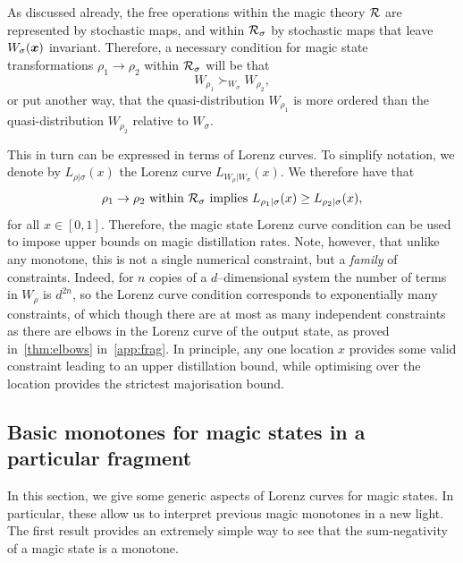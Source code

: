 \documentclass[pra,
aps,
twocolumn,
superscriptaddress,
groupedaddress,
nofootinbib,
reprint
]{revtex4-1}
\begin{document}
As discussed already, the free operations within the magic theory $\mathcal{R}$ are represented by stochastic maps, and within $\mathcal{R}_\sigma$ by stochastic maps that leave $W_\sigma(\boldsymbol{x})$ invariant. Therefore, a necessary condition for magic state transformations $\rho_1 \rightarrow \rho_2$ within $\mathcal{R}_\sigma$ will be that 
\begin{equation}
	W_{\rho_1} \succ_{W_{\sigma}} W_{\rho_2},
\end{equation}
or put another way, that the quasi-distribution $W_{\rho_1}$ is more ordered than the quasi-distribution $W_{\rho_2}$ relative to $W_\sigma$.

This in turn can be expressed in terms of Lorenz curves. To simplify notation, we denote by $L_{\rho | \sigma}(x)$ the Lorenz curve $L_{W_{\rho} | W_{\sigma}} (x)$. We therefore have that
\begin{equation}
\rho_1 \rightarrow \rho_2 \mbox{ within }\mathcal{R}_\sigma \mbox{ implies } L_{\rho_1 |\sigma} (x) \ge L_{\rho_2 |\sigma} (x),
\end{equation}
for all $x \in [0,1]$. Therefore, the magic state Lorenz curve condition can be used to impose upper bounds on magic distillation rates. Note, however, that unlike any monotone, this is not a single numerical constraint, but a \emph{family} of constraints. Indeed, for $n$ copies of a $d$--dimensional system the number of terms in $W_{\rho}$ is $d^{2n}$, so the Lorenz curve condition corresponds to exponentially many constraints, of which though there are at most as many independent constraints as there are elbows in the Lorenz curve of the output state, as proved in~\cref{thm:elbows} in~\cref{app:frag}.
In principle, any one location $x$ provides some valid constraint leading to an upper distillation bound, while optimising over the location provides the strictest majorisation bound.

\subsection{Basic monotones for magic states in a particular fragment}
\label{sec:monotones_frag}

In this section, we give some generic aspects of Lorenz curves for magic states. In particular, these allow us to interpret previous magic monotones in a new light. The first result provides an extremely simple way to see that the sum-negativity of a magic state is a monotone.
\end{document}
